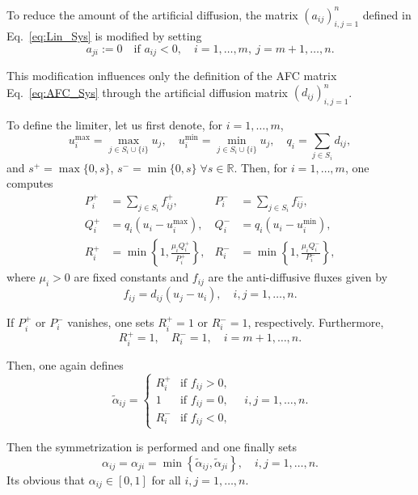 \documentclass[a4paper]{article}
\newcommand{\R}{\mathbb{R}}
\theoremstyle{plain}
\theoremstyle{definition}
\theoremstyle{remark}
\begin{document}
To reduce the amount of the artificial diffusion, the matrix $(a_{ij})_{i,j=1}^n$ defined in Eq.~\eqref{eq:Lin_Sys} is modified by setting
\[
a_{ji} := 0 \quad \text{if } a_{ij} < 0, \quad i = 1, \dots, m, \ j = m+1, \dots, n.
\]

This modification influences only the definition of the AFC matrix Eq.~\eqref{eq:AFC_Sys} through the artificial diffusion matrix $(d_{ij})_{i,j=1}^n$.

To define the limiter, let us first denote, for $i = 1, \dots, m$,
\begin{equation}
	u_i^{\max} = \max_{j \in S_i \cup \{i\}} u_j, \quad u_i^{\min} = \min_{j \in S_i \cup \{i\}} u_j, \quad q_i = \sum_{j \in S_i} d_{ij} , \label{def:minmax}
\end{equation}
and $s^+ = \max\{0,s\}$, $s^- = \min\{0,s\} \; \forall s\in \R$. Then, for $i = 1, \dots, m$, one computes
\begin{align}
	P_i^+ &= \sum_{j \in S_i} f_{ij}^+, & P_i^- &= \sum_{j \in S_i} f_{ij}^-,\label{eq:BJKInit}  \\
	Q_i^+ &= q_i (u_i - u_i^{\max}), & Q_i^- &= q_i (u_i - u_i^{\min}),  \\
	R_i^+ &= \min \left\{1, \frac{\mu_i Q_i^+}{P_i^+} \right\}, & R_i^- &= \min \left\{1, \frac{\mu_i Q_i^-}{P_i^-} \right\},\label{eq:Rpm}
\end{align}
where $\mu_i > 0$ are fixed constants and $f_{ij}$ are the anti-diffusive fluxes given by
\begin{equation*}
	f_{ij} = d_{ij} (u_j - u_i), \quad i, j = 1, \dots, n.
\end{equation*}

If $P_i^+$ or $P_i^-$ vanishes, one sets $R_i^+ = 1$ or $R_i^- = 1$, respectively. Furthermore,
\begin{equation}
	R_i^+ = 1, \quad R_i^- = 1, \quad i = m + 1, \dots, n. \label{eq:Def_1}
\end{equation}

Then, one again defines
\begin{equation*}
	\widetilde{\alpha}_{ij} = \begin{cases} 
		R_i^+ & \text{if } f_{ij} > 0, \\ 
		1 & \text{if } f_{ij} = 0, \\ 
		R_i^- & \text{if } f_{ij} < 0, 
	\end{cases} \quad i, j = 1, \dots, n. 
\end{equation*}

Then the symmetrization is performed and one finally sets
\begin{equation}
	\alpha_{ij} = \alpha_{ji} = \min \left\{\widetilde{\alpha}_{ij}, \widetilde{\alpha}_{ji}\right\} , \quad i, j = 1, \dots, n. \label{eq:Def_6}
\end{equation}
Its obvious that $\alpha_{ij} \in [0, 1]$ for all $i, j = 1, \dots, n$.
\end{document}

